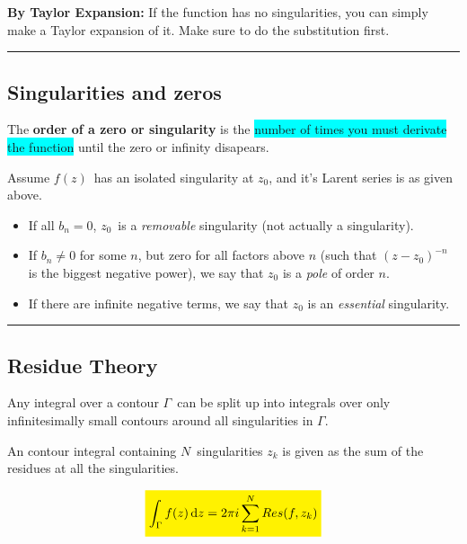 \documentclass[10pt,a4paper]{article}
\newcommand{\holine}[1][\medskipamount]{\par\vspace*{\dimexpr-\parskip-\baselineskip+#1}\noindent\rule{\linewidth}{1pt}\par\vspace*{\dimexpr-\parskip-.5\baselineskip+#1}}
\newcommand{\yl}[1]{\colorbox{yellow}{$\displaystyle #1$}}
\newcommand{\gr}[1]{\colorbox{green}{$\displaystyle #1$}}
\newcommand{\bll}{\colorbox{cyan}}
\begin{document}
\begin{multicols}{2}

\textbf{By Taylor Expansion:} If the function has no singularities, you can simply make a Taylor expansion of it. Make sure to do the substitution first.


\holine
\subsection*{Singularities and zeros}
The \textbf{order of a zero or singularity} is the \bll{number of times you must derivate the function} until the zero or infinity disapears.

Assume $f(z)$ has an isolated singularity at $z_0$, and it's Larent series is as given above.
\begin{itemize}
    \item If all $b_n = 0$, $z_0$ is a \textit{removable} singularity (not actually a singularity).
    \item If $b_n \neq 0$ for some $n$, but zero for all factors above $n$ (such that $(z-z_0)^{-n}$ is the biggest negative power), we say that $z_0$ is a \textit{pole} of order $n$.
    \item If there are infinite negative terms, we say that $z_0$ is an \textit{essential} singularity.
\end{itemize}


\holine
\subsection*{Residue Theory}
Any integral over a contour $\Gamma$ can be split up into integrals over only infinitesimally small contours around all singularities in $\Gamma$.

An contour integral containing $N$ singularities $z_k$ is given as the sum of the residues at all the singularities.

\[\yl{
    \int_\Gamma f(z) \dd{z} = 2\pi i \sum_{k=1}^N Res(f,z_k)
}\]


\end{multicols}
\end{document}
